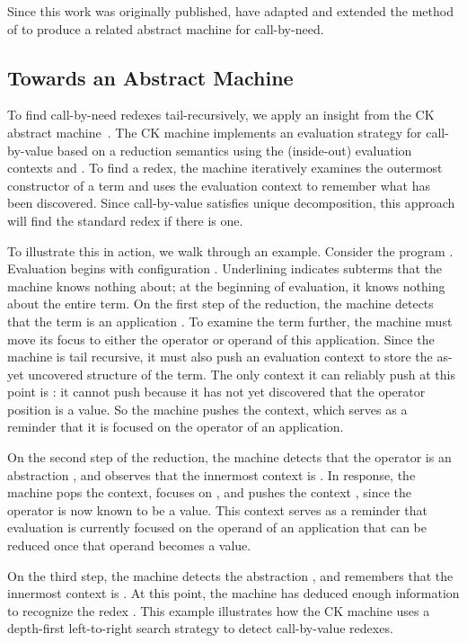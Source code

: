 \documentclass{LMCS}
\theoremstyle{plain}
\theoremstyle{remark}
\begin{document}
Since this work was originally published, \citet{danvy10need} have adapted and
extended the method of \citet{danvyTRrefocusing} to produce a related
abstract machine for call-by-need.




\subsection{Towards an Abstract Machine}


To find call-by-need redexes tail-recursively, we apply an insight from
the CK abstract machine~\cite{felleisen86secd,findler09redex}.
The CK machine implements an evaluation strategy for call-by-value based on a
reduction semantics using the (inside-out) evaluation contexts 
and .  To find a redex, the machine iteratively
examines the outermost constructor of a term and uses the evaluation context to
remember what has been discovered.  Since call-by-value satisfies unique
decomposition, this approach will find the standard redex if there is one.

To illustrate this in action, we walk through an example.  Consider the program
.  Evaluation begins with configuration
.  Underlining
indicates subterms that the machine knows nothing about;  at the beginning of
evaluation, it knows nothing about the entire term.  On
the first step of the reduction, the machine detects that the term is an
application . 
To examine the term further, the machine must move its focus to either the
operator or operand of this application. Since the machine is tail recursive,
it must also push an evaluation context to store the as-yet uncovered structure
of the term.  The only context it can reliably push at this point is
: it cannot push
 because it has not yet discovered that the
operator position is a value.  So the machine pushes the
 context, which serves as a reminder that it is
focused on the operator of an application.

On the second step of the reduction, the machine detects that the operator is
an abstraction , and observes that the innermost
context is .  In response, the machine pops the
context, focuses on , and pushes the context
, since the operator is now known to be a
value.  This context serves as a reminder that evaluation is currently
focused on the operand of an application that can be reduced once that operand
becomes a value.

On the third step, the machine detects the abstraction 
, and remembers that the innermost context is
.  At this point, the machine has deduced
enough information to recognize the redex
.
This example illustrates how the CK machine uses a depth-first left-to-right
search strategy to detect call-by-value redexes.
\end{document}
